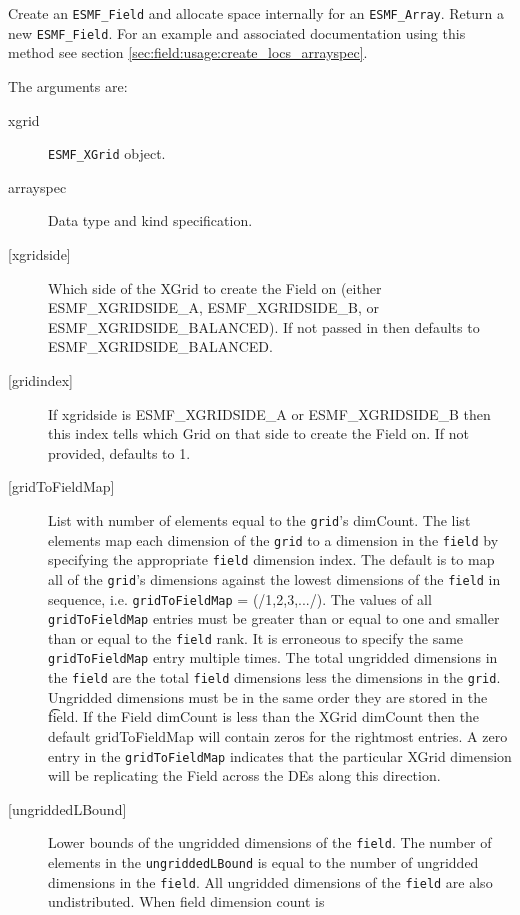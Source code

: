    Create an {\tt ESMF\_Field} and allocate space internally for an
   {\tt ESMF\_Array}. Return a new {\tt ESMF\_Field}. For an example and
   associated documentation using this method see section
   \ref{sec:field:usage:create_locs_arrayspec}.
  
   The arguments are:
   \begin{description}
   \item [xgrid]
   {\tt ESMF\_XGrid} object.
   \item [arrayspec]
   Data type and kind specification.
   \item [{[xgridside]}]
   Which side of the XGrid to create the Field on (either ESMF\_XGRIDSIDE\_A,
   ESMF\_XGRIDSIDE\_B, or ESMF\_XGRIDSIDE\_BALANCED). If not passed in then
   defaults to ESMF\_XGRIDSIDE\_BALANCED.
   \item [{[gridindex]}]
   If xgridside is ESMF\_XGRIDSIDE\_A or ESMF\_XGRIDSIDE\_B then this index tells which Grid on
   that side to create the Field on. If not provided, defaults to 1.
   \item [{[gridToFieldMap]}]
   List with number of elements equal to the
   {\tt grid}'s dimCount. The list elements map each dimension
   of the {\tt grid} to a dimension in the {\tt field} by
   specifying the appropriate {\tt field} dimension index. The default is to
   map all of the {\tt grid}'s dimensions against the lowest dimensions of
   the {\tt field} in sequence, i.e. {\tt gridToFieldMap} = (/1,2,3,.../).
   The values of all {\tt gridToFieldMap} entries must be greater than or equal
   to one and smaller than or equal to the {\tt field} rank.
   It is erroneous to specify the same {\tt gridToFieldMap} entry
   multiple times. The total ungridded dimensions in the {\tt field}
   are the total {\tt field} dimensions less
   the dimensions in
   the {\tt grid}. Ungridded dimensions must be in the same order they are
   stored in the {\t field}.
   If the Field dimCount is less than the XGrid dimCount then the default
   gridToFieldMap will contain zeros for the rightmost entries. A zero
   entry in the {\tt gridToFieldMap} indicates that the particular
   XGrid dimension will be replicating the Field across the DEs along
   this direction.
   \item [{[ungriddedLBound]}]
   Lower bounds of the ungridded dimensions of the {\tt field}.
   The number of elements in the {\tt ungriddedLBound} is equal to the number of ungridded
   dimensions in the {\tt field}. All ungridded dimensions of the
   {\tt field} are also undistributed. When field dimension count is

\end{description}
